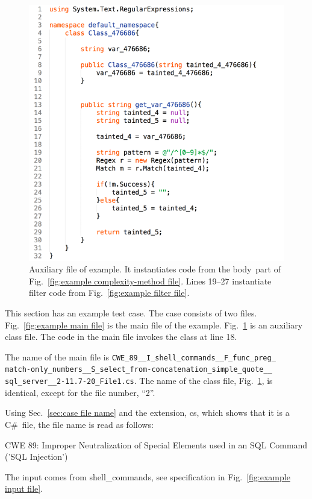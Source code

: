 \documentclass[12pt]{article}
\newcommand{\CSharp}{C{\fontseries{b}\selectfont\#}}
\begin{document}
\begin{figure}[htbp]
  \includegraphics[width=0.85\linewidth]{fig_example_code2.png}
  \caption{Auxiliary file of example.  It instantiates code from the
    \texlangle body\texrangle\ part of Fig.~\ref{fig:example complexity-method file}.
    Lines 19--27 instantiate filter code
    from Fig.~\ref{fig:example filter file}.}
  \label{fig:example aux file}
\end{figure}

This section has an example test case.  The case consists of 
two files.
Fig.~\ref{fig:example main file} is the main file of the example.  
Fig.~\ref{fig:example aux file} is an auxiliary class file.  
The code in
the main file invokes the class at line 18.

The name of the main file is
\verb|CWE_89__I_shell_commands__F_func_preg_| \\
\verb|match-only_numbers__S_select_from-concatenation_simple_quote__| \\
\verb|sql_server__2-11.7-20_File1.cs|.
The name of the class file, Fig.~\ref{fig:example aux file}, is
identical, except for the
file number, ``2''.

Using Sec.~\ref{sec:case file name} and the extension, cs, which shows that it is a
\CSharp\ file, the file name is read as follows:

\noindent CWE 89: Improper Neutralization of Special Elements used in an SQL Command
('SQL Injection') \cite{CWE89}

\noindent The input comes from shell\_commands, see specification in
Fig.~\ref{fig:example input file}.
\end{document}
